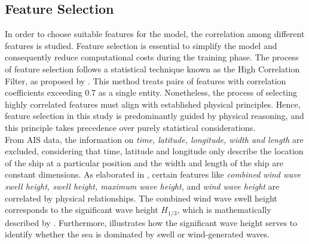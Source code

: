 \subsection{Feature Selection}\label{sec:feature_select}

In order to choose suitable features for the model, the correlation among different features is studied. Feature selection is essential to simplify the model and consequently reduce computational costs during the training phase. The process of feature selection follows a statistical technique known as the High Correlation Filter, as proposed by . This method treats pairs of features with correlation coefficients exceeding 0.7 as a single entity. Nonetheless, the process of selecting highly correlated features must align with established physical principles. Hence, feature selection in this study is predominantly guided by physical reasoning, and this principle takes precedence over purely statistical considerations.\\

From AIS data, the information on \emph{time, latitude, longitude, width and length} are excluded, considering that time, latitude and longitude only describe the location of the ship at a particular position and the width and length of the ship are constant dimensions. As elaborated in , certain features like \emph{combined wind wave swell height, swell height, maximum wave height,} and \emph{wind wave height} are correlated by physical relationships. The combined wind wave swell height corresponds to the significant wave height $H_{1/3}$, which is mathematically described by . Furthermore,  illustrates how the significant wave height serves to identify whether the sea is dominated by swell or wind-generated waves.\\

